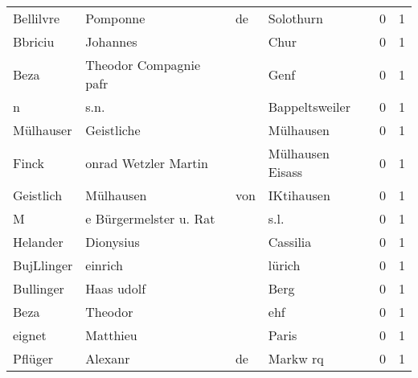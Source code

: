 \begin{tabular}{llllrr}
                Bellilvre &                           Pomponne &          de &                                   Solothurn &          0 &         1 \\
                  Bbriciu &                           Johannes &             &                                        Chur &          0 &         1 \\
                     Beza &             Theodor Compagnie pafr &             &                                        Genf &          0 &         1 \\
                        n &                               s.n. &             &                              Bappeltsweiler &          0 &         1 \\
                Mülhauser &                         Geistliche &             &                                   Mülhausen &          0 &         1 \\
                    Finck &               onrad Wetzler Martin &             &                            Mülhausen Eisass &          0 &         1 \\
                Geistlich &                          Mülhausen &         von &                                  IKtihausen &          0 &         1 \\
                        M &             e Bürgermelster u. Rat &             &                                        s.l. &          0 &         1 \\
                 Helander &                          Dionysius &             &                                    Cassilia &          0 &         1 \\
               BujLlinger &                            einrich &             &                                      lürich &          0 &         1 \\
                Bullinger &                         Haas udolf &             &                                        Berg &          0 &         1 \\
                     Beza &                            Theodor &             &                                         ehf &          0 &         1 \\
                   eignet &                           Matthieu &             &                                       Paris &          0 &         1 \\
                  Pflüger &                            Alexanr &          de &                                    Markw rq &          0 &         1 \\

\end{tabular}
